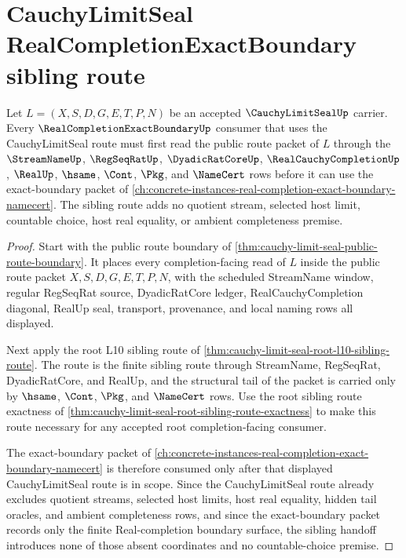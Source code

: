 \section{CauchyLimitSeal RealCompletionExactBoundary sibling route}
\label{sec:cauchy-limit-seal-real-completion-exact-boundary-sibling-route}

\begin{theorem}
\label{thm:cauchy-limit-seal-real-completion-exact-boundary-sibling-route}
Let $L=(X,S,D,G,E,T,P,N)$ be an accepted $\CauchyLimitSealUp$ carrier. Every $\RealCompletionExactBoundaryUp$ consumer that uses the CauchyLimitSeal route must first read the public route packet of $L$ through the $\StreamNameUp$, $\RegSeqRatUp$, $\DyadicRatCoreUp$, $\RealCauchyCompletionUp$, $\RealUp$, $\hsame$, $\Cont$, $\Pkg$, and $\NameCert$ rows before it can use the exact-boundary packet of \autoref{ch:concrete-instances-real-completion-exact-boundary-namecert}. The sibling route adds no quotient stream, selected host limit, countable choice, host real equality, or ambient completeness premise.
\end{theorem}
\begin{proof}
Start with the public route boundary of \autoref{thm:cauchy-limit-seal-public-route-boundary}. It places every completion-facing read of $L$ inside the public route packet $X,S,D,G,E,T,P,N$, with the scheduled StreamName window, regular RegSeqRat source, DyadicRatCore ledger, RealCauchyCompletion diagonal, RealUp seal, transport, provenance, and local naming rows all displayed.

Next apply the root L10 sibling route of \autoref{thm:cauchy-limit-seal-root-l10-sibling-route}. The route is the finite sibling route through StreamName, RegSeqRat, DyadicRatCore, and RealUp, and the structural tail of the packet is carried only by $\hsame$, $\Cont$, $\Pkg$, and $\NameCert$ rows. Use the root sibling route exactness of \autoref{thm:cauchy-limit-seal-root-sibling-route-exactness} to make this route necessary for any accepted root completion-facing consumer.

The exact-boundary packet of \autoref{ch:concrete-instances-real-completion-exact-boundary-namecert} is therefore consumed only after that displayed CauchyLimitSeal route is in scope. Since the CauchyLimitSeal route already excludes quotient streams, selected host limits, host real equality, hidden tail oracles, and ambient completeness rows, and since the exact-boundary packet records only the finite Real-completion boundary surface, the sibling handoff introduces none of those absent coordinates and no countable-choice premise.
\end{proof}
